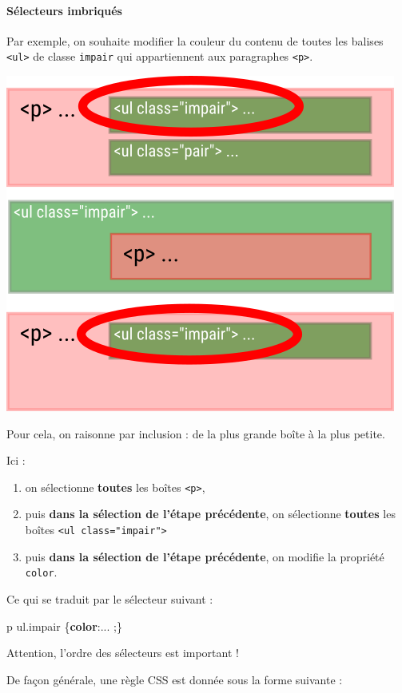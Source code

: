 \documentclass[a4paper,17pt]{extarticle}
\providecommand{\tightlist}{%
      \setlength{\itemsep}{0pt}\setlength{\parskip}{0pt}}
\newenvironment{Shaded}{}{}
\newcommand{\KeywordTok}[1]{\textcolor[rgb]{0.00,0.44,0.13}{\textbf{{#1}}}}
\newcommand{\FunctionTok}[1]{\textcolor[rgb]{0.02,0.16,0.49}{{#1}}}
\newcommand{\NormalTok}[1]{{#1}}
\newcommand{\OperatorTok}[1]{\textcolor[rgb]{0.40,0.40,0.40}{{#1}}}
\begin{document}
    \hypertarget{suxe9lecteurs-imbriquuxe9s}{%
\paragraph{Sélecteurs imbriqués}\label{suxe9lecteurs-imbriquuxe9s}}
\begin{exemple}
    Par exemple, on souhaite modifier la couleur du contenu de toutes les
balises \texttt{\textless{}ul\textgreater{}} de classe \texttt{impair}
qui appartiennent aux paragraphes \texttt{\textless{}p\textgreater{}}.

\includegraphics{res/selecteur.png}

Pour cela, on raisonne par inclusion : de la plus grande boîte à la plus
petite.

Ici :

\begin{enumerate}
\def\labelenumi{\arabic{enumi}.}
\tightlist
\item
  on sélectionne \textbf{toutes} les boîtes
  \texttt{\textless{}p\textgreater{}},
\item
  puis \textbf{dans la sélection de l'étape précédente}, on sélectionne
  \textbf{toutes} les boîtes
  \texttt{\textless{}ul\ class="impair"\textgreater{}}
\item
  puis \textbf{dans la sélection de l'étape précédente}, on modifie la
  propriété \texttt{color}.
\end{enumerate}

Ce qui se traduit par le sélecteur suivant :

\begin{Shaded}
\begin{Highlighting}[]
\NormalTok{p ul}\FunctionTok{.impair}\NormalTok{ \{}\KeywordTok{color}\NormalTok{:... }\OperatorTok{;}\NormalTok{\}}
\end{Highlighting}
\end{Shaded}

Attention, l'ordre des sélecteurs est important !

            \end{exemple}
    De façon générale, une règle CSS est donnée sous la forme suivante :
\end{document}
